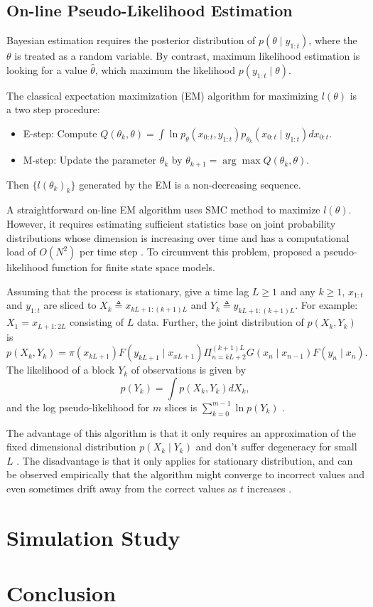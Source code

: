 \subsection{On-line Pseudo-Likelihood Estimation}

Bayesian estimation requires the posterior distribution of $p(\theta\mid y_{1:t})$, where the $\theta$ is treated as a random variable. By contrast, maximum likelihood estimation is looking for a value $\hat{\theta}$, which maximum the likelihood $p(y_{1:t}\mid \theta)$. 

The classical expectation maximization (EM) algorithm \cite{dempster1977maximum} for maximizing $l(\theta)$ is a two step procedure: 
\begin{itemize}
\item{E-step}:   Compute  $Q(\theta_k,\theta)=\int \ln p_\theta(x_{0:t},y_{1:t})p_{\theta_k}(x_{0:t}\mid y_{1:t}) dx_{0:t}$. 
\item{M-step}: Update the parameter $\theta_k$ by $\theta_{k+1}=\arg \max Q(\theta_k,\theta)$.
\end{itemize}
Then $\{l(\theta_k)_k\}$ generated by the EM is a non-decreasing sequence.  

A straightforward on-line EM algorithm uses SMC method to maximize $l(\theta)$. However, it requires estimating sufficient statistics base on joint probability distributions whose dimension is increasing over time and has a computational load of $\mathit{O}(N^2)$ per time step \cite{kantas2009overview}.  To circumvent this problem, \cite{andrieu2005line} proposed a pseudo-likelihood function for finite state space models. 

Assuming that the process is stationary, give a time lag $L\geq 1$ and any $k\geq 1$, $x_{1:t}$ and $y_{1:t}$ are sliced to $X_k\triangleq x_{kL+1:(k+1)L}$ and $Y_k\triangleq y_{kL+1:(k+1)L}$. For example: $X_1= x_{L+1:2L}$ consisting of $L$ data. Further, the joint distribution of $p(X_k,Y_k)$ is 
\begin{equation}
p(X_k,Y_k) = \pi(x_{kL+1})F(y_{kL+1}\mid x_{xL+1})\Pi_{n=kL+2}^{(k+1)L}G(x_n\mid x_{n-1})F(y_n\mid x_n). 
\end{equation}
The likelihood of a block $Y_k$ of observations is given by 
\begin{equation}
p(Y_k) = \int p(X_k,Y_k)dX_k,
\end{equation}
and the log pseudo-likelihood for $m$ slices is $\sum_{k=0}^{m-1}\ln p(Y_k)$  \cite{andrieu2005line}.


The advantage of this algorithm is that it only requires an approximation of the fixed dimensional distribution $p(X_k\mid Y_k)$ and don't suffer degeneracy for small $L$ \cite{kantas2009overview}. The disadvantage is that it only applies for stationary distribution, and can be observed empirically that the algorithm might converge to incorrect values and even sometimes drift away from the correct values as $t$ increases \cite{andrieu2010particle}.  



\section{Simulation Study}\label{sectionFilterreviewSimulation}


\section{Conclusion}


